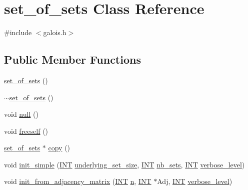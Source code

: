 \hypertarget{classset__of__sets}{}\section{set\+\_\+of\+\_\+sets Class Reference}
\label{classset__of__sets}


{\ttfamily \#include $<$galois.\+h$>$}

\subsection*{Public Member Functions}
\begin{DoxyCompactItemize}
\item 
\mbox{\hyperlink{classset__of__sets_ad07d3908a5f6972e2defe4db643dcb1e}{set\+\_\+of\+\_\+sets}} ()
\item 
\mbox{\hyperlink{classset__of__sets_ab91749ac773a8686f9372652c1d7d43e}{$\sim$set\+\_\+of\+\_\+sets}} ()
\item 
void \mbox{\hyperlink{classset__of__sets_a0781046b5156beb68e73fc3794df0b57}{null}} ()
\item 
void \mbox{\hyperlink{classset__of__sets_a7beb89198bccadbc37ac231ba7213e48}{freeself}} ()
\item 
\mbox{\hyperlink{classset__of__sets}{set\+\_\+of\+\_\+sets}} $\ast$ \mbox{\hyperlink{classset__of__sets_aebe21c52c36edd9b2439f3e0c9c3f333}{copy}} ()
\item 
void \mbox{\hyperlink{classset__of__sets_a0c90576a42f3cf82abb307fa8dd97162}{init\+\_\+simple}} (\mbox{\hyperlink{galois_8h_a09fddde158a3a20bd2dcadb609de11dc}{I\+NT}} \mbox{\hyperlink{classset__of__sets_a5af40b6f333f35f29c948c252043bfc0}{underlying\+\_\+set\+\_\+size}}, \mbox{\hyperlink{galois_8h_a09fddde158a3a20bd2dcadb609de11dc}{I\+NT}} \mbox{\hyperlink{classset__of__sets_a2930f0f9f4726f78dd91990cb26bcf28}{nb\+\_\+sets}}, \mbox{\hyperlink{galois_8h_a09fddde158a3a20bd2dcadb609de11dc}{I\+NT}} \mbox{\hyperlink{simeon_8_c_a818073fbcc2f439e7c56952f67386122}{verbose\+\_\+level}})
\item 
void \mbox{\hyperlink{classset__of__sets_ace9a38e27dd42625a10cf9682e01392a}{init\+\_\+from\+\_\+adjacency\+\_\+matrix}} (\mbox{\hyperlink{galois_8h_a09fddde158a3a20bd2dcadb609de11dc}{I\+NT}} \mbox{\hyperlink{simeon_8_c_a7f2cd26777ce0ff3fdaf8d02aacbddfb}{n}}, \mbox{\hyperlink{galois_8h_a09fddde158a3a20bd2dcadb609de11dc}{I\+NT}} $\ast$Adj, \mbox{\hyperlink{galois_8h_a09fddde158a3a20bd2dcadb609de11dc}{I\+NT}} \mbox{\hyperlink{simeon_8_c_a818073fbcc2f439e7c56952f67386122}{verbose\+\_\+level}})

\end{DoxyCompactItemize}
